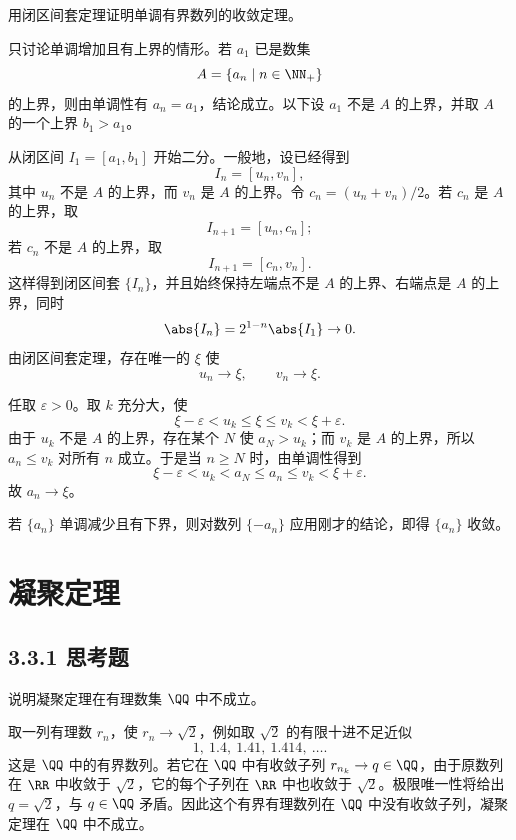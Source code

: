 \begin{xexercise}[3.2.3 练习题 5]
用闭区间套定理证明单调有界数列的收敛定理。
\end{xexercise}
\begin{xsolution}
只讨论单调增加且有上界的情形。若 $a_1$ 已是数集
\[
  A=\{a_n\mid n\in\NN_+\}
\]
的上界，则由单调性有 $a_n=a_1$，结论成立。以下设 $a_1$ 不是 $A$ 的上界，并取 $A$ 的一个上界 $b_1>a_1$。

从闭区间 $I_1=[a_1,b_1]$ 开始二分。一般地，设已经得到
\[
  I_n=[u_n,v_n],
\]
其中 $u_n$ 不是 $A$ 的上界，而 $v_n$ 是 $A$ 的上界。令 $c_n=(u_n+v_n)/2$。若 $c_n$ 是 $A$ 的上界，取
\[
  I_{n+1}=[u_n,c_n];
\]
若 $c_n$ 不是 $A$ 的上界，取
\[
  I_{n+1}=[c_n,v_n].
\]
这样得到闭区间套 $\{I_n\}$，并且始终保持左端点不是 $A$ 的上界、右端点是 $A$ 的上界，同时
\[
  \abs{I_n}=2^{1-n}\abs{I_1}\to0.
\]
由闭区间套定理，存在唯一的 $\xi$ 使
\[
  u_n\to\xi,\qquad v_n\to\xi.
\]

任取 $\varepsilon>0$。取 $k$ 充分大，使
\[
  \xi-\varepsilon<u_k\leqslant\xi\leqslant v_k<\xi+\varepsilon.
\]
由于 $u_k$ 不是 $A$ 的上界，存在某个 $N$ 使 $a_N>u_k$；而 $v_k$ 是 $A$ 的上界，所以 $a_n\leqslant v_k$ 对所有 $n$ 成立。于是当 $n\geqslant N$ 时，由单调性得到
\[
  \xi-\varepsilon<u_k<a_N\leqslant a_n\leqslant v_k<\xi+\varepsilon.
\]
故 $a_n\to\xi$。

若 $\{a_n\}$ 单调减少且有下界，则对数列 $\{-a_n\}$ 应用刚才的结论，即得 $\{a_n\}$ 收敛。
\end{xsolution}

\section{凝聚定理}
\subsection*{3.3.1 思考题}

\begin{xthought}[3.3.1 思考题]
说明凝聚定理在有理数集 $\QQ$ 中不成立。
\end{xthought}
\begin{xsolution}
取一列有理数 $r_n$，使 $r_n\to\sqrt2$，例如取 $\sqrt2$ 的有限十进不足近似
\[
  1,\ 1.4,\ 1.41,\ 1.414,\ \ldots.
\]
这是 $\QQ$ 中的有界数列。若它在 $\QQ$ 中有收敛子列 $r_{n_k}\to q\in\QQ$，由于原数列在 $\RR$ 中收敛于 $\sqrt2$，它的每个子列在 $\RR$ 中也收敛于 $\sqrt2$。极限唯一性将给出 $q=\sqrt2$，与 $q\in\QQ$ 矛盾。因此这个有界有理数列在 $\QQ$ 中没有收敛子列，凝聚定理在 $\QQ$ 中不成立。
\end{xsolution}

